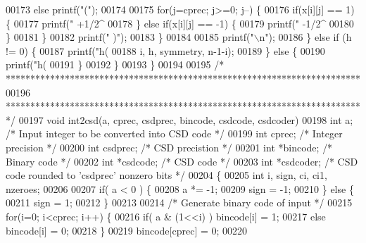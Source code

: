 \begin{DoxyCode}
{{{{{{{{{{{{{{{{00173                 \textcolor{keywordflow}{else} printf(\textcolor{stringliteral}{"("});
00174 
00175                 \textcolor{keywordflow}{for}(j=cprec; j>=0; j--) \{
00176                     \textcolor{keywordflow}{if}(x[i][j] == 1) \{
00177                         printf(\textcolor{stringliteral}{" +1/2^%
00178                     \} \textcolor{keywordflow}{else} \textcolor{keywordflow}{if}(x[i][j] == -1) \{
00179                         printf(\textcolor{stringliteral}{" -1/2^%
00180                     \}
00181                 \}
00182                 printf(\textcolor{stringliteral}{" )"});
00183             \}
00184 
00185             printf(\textcolor{stringliteral}{"\(\backslash\)n"});
00186         \} \textcolor{keywordflow}{else} \textcolor{keywordflow}{if} (h != 0) \{
00187             printf(\textcolor{stringliteral}{"h(%
00188                 i, h, symmetry, n-1-i);
00189         \} \textcolor{keywordflow}{else} \{
00190             printf(\textcolor{stringliteral}{"h(%
00191         \}
00192     \}
00193 \}
00194 
00195 \textcolor{comment}{/* ************************************************************************ }
00196 \textcolor{comment}{   ************************************************************************ */}
00197 \textcolor{keywordtype}{void} int2csd(a, cprec, csdprec, bincode, csdcode, csdcoder)
00198 int a;      \textcolor{comment}{/* Input integer to be converted into CSD code */}
00199 \textcolor{keywordtype}{int} cprec;  \textcolor{comment}{/* Integer precision */}
00200 \textcolor{keywordtype}{int} csdprec;    \textcolor{comment}{/* CSD precistion */}
00201 \textcolor{keywordtype}{int} *bincode;   \textcolor{comment}{/* Binary code */}
00202 \textcolor{keywordtype}{int} *csdcode;   \textcolor{comment}{/* CSD code */}
00203 \textcolor{keywordtype}{int} *csdcoder;  \textcolor{comment}{/* CSD code rounded to 'csdprec' nonzero bits */}
00204 \{
00205     \textcolor{keywordtype}{int} i, sign, ci, ci1, nzeroes;
00206 
00207     \textcolor{keywordflow}{if}( a < 0 ) \{
00208         a *= -1;
00209         sign = -1; 
00210     \} \textcolor{keywordflow}{else} \{
00211         sign = 1;
00212     \}
00213 
00214     \textcolor{comment}{/* Generate binary code of input */}
00215     \textcolor{keywordflow}{for}(i=0; i<cprec; i++) \{
00216         \textcolor{keywordflow}{if}( a & (1<<i) ) bincode[i] = 1;
00217         \textcolor{keywordflow}{else} bincode[i] = 0;
00218     \}
00219     bincode[cprec] = 0;
00220     
}}}}}}}}}}}}}}}}}}}}
\end{DoxyCode}
